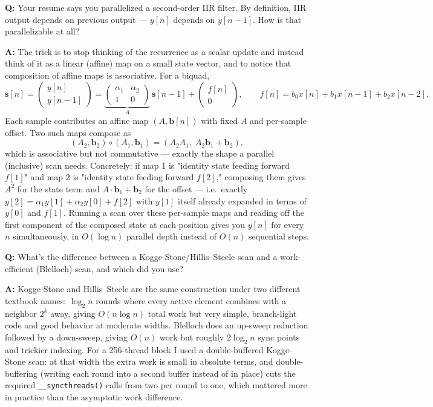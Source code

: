 \documentclass[11pt]{article}
\newcommand{\Q}[1]{\vspace{0.6em}\noindent\textbf{\textcolor{blue!60!black}{Q:}} #1\par}
\newcommand{\A}[1]{\noindent\textbf{A:} #1\par}
\begin{document}
\Q{Your resume says you parallelized a second-order IIR filter. By definition, IIR output depends on previous output --- $y[n]$ depends on $y[n-1]$. How is that parallelizable at all?}
\A{The trick is to stop thinking of the recurrence as a scalar update and instead think of it as a linear (affine) map on a small state vector, and to notice that composition of affine maps is associative. For a biquad,
\[
\mathbf{s}[n] = \begin{pmatrix} y[n] \\ y[n-1] \end{pmatrix}
= \underbrace{\begin{pmatrix} \alpha_1 & \alpha_2 \\ 1 & 0 \end{pmatrix}}_{A}\, \mathbf{s}[n-1] + \begin{pmatrix} f[n] \\ 0 \end{pmatrix},
\qquad f[n] = b_0x[n]+b_1x[n-1]+b_2x[n-2].
\]
Each sample contributes an affine map $(A, \mathbf{b}[n])$ with fixed $A$ and per-sample offset. Two such maps compose as
\[
(A_2, \mathbf{b}_2)\circ(A_1,\mathbf{b}_1) = (A_2A_1,\; A_2\mathbf{b}_1+\mathbf{b}_2),
\]
which is associative but not commutative --- exactly the shape a parallel (inclusive) scan needs. Concretely: if map 1 is "identity state feeding forward $f[1]$" and map 2 is "identity state feeding forward $f[2]$," composing them gives $A^2$ for the state term and $A\cdot\mathbf{b}_1+\mathbf{b}_2$ for the offset --- i.e.\ exactly $y[2]=\alpha_1 y[1]+\alpha_2 y[0]+f[2]$ with $y[1]$ itself already expanded in terms of $y[0]$ and $f[1]$. Running a scan over these per-sample maps and reading off the first component of the composed state at each position gives you $y[n]$ for every $n$ simultaneously, in $O(\log n)$ parallel depth instead of $O(n)$ sequential steps.}

\Q{What's the difference between a Kogge-Stone/Hillis--Steele scan and a work-efficient (Blelloch) scan, and which did you use?}
\A{Kogge-Stone and Hillis--Steele are the same construction under two different textbook names: $\log_2 n$ rounds where every active element combines with a neighbor $2^k$ away, giving $O(n\log n)$ total work but very simple, branch-light code and good behavior at moderate widths. Blelloch does an up-sweep reduction followed by a down-sweep, giving $O(n)$ work but roughly $2\log_2 n$ sync points and trickier indexing. For a 256-thread block I used a double-buffered Kogge-Stone scan: at that width the extra work is small in absolute terms, and double-buffering (writing each round into a second buffer instead of in place) cuts the required \texttt{\_\_syncthreads()} calls from two per round to one, which mattered more in practice than the asymptotic work difference.}
\end{document}
